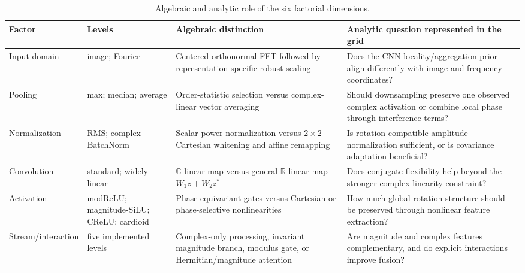 \begin{table}[t]
\centering
\caption{Algebraic and analytic role of the six factorial dimensions.}
\label{tab:factor-algebra}
\scriptsize
\begin{tabularx}{\textwidth}{L{2.1cm}L{3.1cm}L{5.0cm}X}
\toprule
Factor & Levels & Algebraic distinction & Analytic question represented in the grid \\
\midrule
Input domain & image; Fourier & Centered orthonormal FFT followed by representation-specific robust scaling & Does the CNN locality/aggregation prior align differently with image and frequency coordinates? \\
Pooling & max; median; average & Order-statistic selection versus complex-linear vector averaging & Should downsampling preserve one observed complex activation or combine local phase through interference terms? \\
Normalization & RMS; complex BatchNorm & Scalar power normalization versus $2\times2$ Cartesian whitening and affine remapping & Is rotation-compatible amplitude normalization sufficient, or is covariance adaptation beneficial? \\
Convolution & standard; widely linear & $\mathbb{C}$-linear map versus general $\mathbb{R}$-linear map $W_1z+W_2z^*$ & Does conjugate flexibility help beyond the stronger complex-linearity constraint? \\
Activation & modReLU; magnitude-SiLU; CReLU; cardioid & Phase-equivariant gates versus Cartesian or phase-selective nonlinearities & How much global-rotation structure should be preserved through nonlinear feature extraction? \\
Stream/interaction & five implemented levels & Complex-only processing, invariant magnitude branch, modulus gate, or Hermitian/magnitude attention & Are magnitude and complex features complementary, and do explicit interactions improve fusion? \\
\bottomrule
\end{tabularx}
\end{table}
